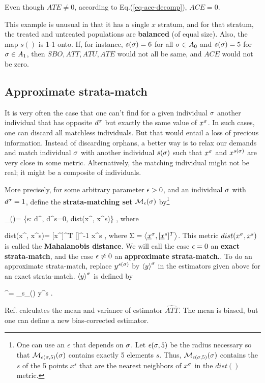 Even though $ATE\neq 0$,
according to Eq.(\ref{eq-ace-decomp}),
$ACE=0$.

This example is unusual
in that it has a single
$x$ stratum, and for
that stratum, 
the treated and 
untreated populations
are {\bf balanced} (of equal size).
Also, the map $s()$
is 1-1 onto.
If, for instance,
$s(\sigma)=6$ for all $\sigma\in A_0$
and $s(\sigma)=5$ for $\sigma\in A_1$,
then $SBO, ATT, ATU, ATE$
would not all be same, and 
$ACE$ would not be zero.  

\subsection{Approximate strata-match}

It is very often
the case that
one can't
find for a given
individual $\sigma$
another individual that has
opposite $d^\sigma$ but
exactly the same value of $x^\sigma$.
In such cases, one can discard all
matchless individuals.
But that would entail a loss 
of precious information.
Instead of discarding orphans, 
a better way is to
relax our demands and
match individual $\sigma$
with another individual $s(\sigma)$
such that $x^\sigma$
and $x^{s(\sigma)}$ are very
close in some metric.
Alternatively, the matching
individual might 
not be real; it might
be a composite
of individuals.

More precisely, 
for some arbitrary
parameter $\epsilon>0$,
and an individual $\sigma$
with $d^\sigma=1$,
define
the {\bf strata-matching set} 
${\cal M}_{\epsilon}(\sigma)$ by\footnote{
One can use an $\epsilon$
that depends on $\sigma$.
Let $\epsilon(\sigma, 5)$
be the radius necessary
so that ${\cal M}_{\epsilon(\sigma, 5)}(\sigma)$
contains exactly 5 elements $s$.
Thus, ${\cal M}_{\epsilon(\sigma, 5)}(\sigma)$
contains the $s$ of the
 5 points $x^s$ that are the
nearest neighbors of $x^\sigma$
in the $dist()$ metric.}

\beq
\calm_{\eps}(\s)=
\{s: d^, d^s=0, 
dist(x^\s, x^s)\leq \eps \}
\;,
\eeq
where

\beq
dist(x^\s, x^s)=
[x^\s]^T [\Sigma]^{-1} x^s
\;,
\eeq
where $\Sigma = \left\langle{\underline{x}}^\sigma, [{\underline{x}}^s]^T\right\rangle$.
 This
metric $dist(x^\sigma, x^s)$ is
called the {\bf Mahalanobis distance}.
We will call
the case $\epsilon=0$ an {\bf  exact strata-match},
and
the case
$\epsilon\neq 0$ 
 an {\bf approximate strata-match.}.
To do an approximate strata-match,
replace $y^{s(\sigma)}$ 
by
$\left\langle y\right\rangle^\sigma$ 
in 
the estimators 
given above 
for an exact strata-match.
$\left\langle y\right\rangle^\sigma$ 
is defined by

\beq
{}^\s=
\sum_{s\in \calm_{\eps}(\s)}
y^s
\;.
\eeq

Ref.\cite{book-mixtape}
calculates the mean and variance
of estimator $\widehat{ATT}$. 
The mean is biased,
but one can define a new
bias-corrected estimator.


